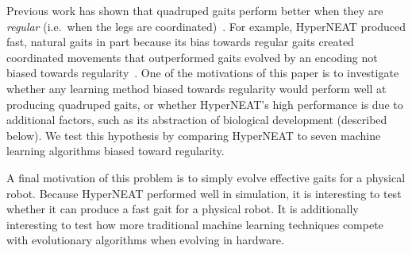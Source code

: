 Previous work has shown that quadruped gaits perform better when they are \emph{regular} (i.e.\ when the legs are coordinated)~\cite{clune2009evolving, clune2011performance,valsalam2008modular}. For example, HyperNEAT produced fast, natural gaits in part because its bias towards regular gaits created coordinated movements that outperformed gaits evolved by an encoding not biased towards regularity~\cite{clune2009evolving, clune2011performance}. One of the motivations of this paper is to investigate whether any learning method biased towards regularity would perform well at producing quadruped gaits, or whether HyperNEAT's high performance is due to additional factors, such as its abstraction of biological development (described below). We test this hypothesis by comparing HyperNEAT to seven machine learning algorithms biased toward regularity. 

A final motivation of this problem is to simply evolve effective gaits for a physical robot. Because HyperNEAT performed well in simulation, it is interesting to test whether it can produce a fast gait for a physical robot. It is additionally interesting to test how more traditional machine learning techniques compete with evolutionary algorithms when evolving in hardware.
